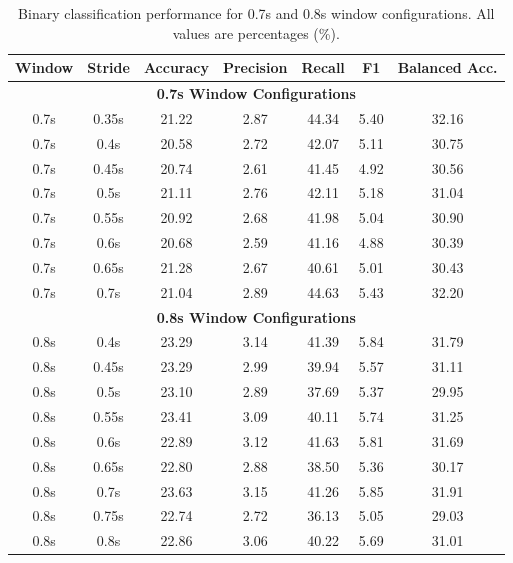 \documentclass[11pt]{article}
\begin{document}
\begin{table}[H]
    \caption{Binary classification performance for 0.7s and 0.8s window configurations. All values are percentages (\%).}
    \centering
    \label{tab:binary-performance-0.7-0.8}
    \scriptsize
    \setlength{\tabcolsep}{3pt}
    \begin{tabular}{|c|c|c|c|c|c|c|}
        \hline
        \textbf{Window} & \textbf{Stride} & \textbf{Accuracy} & \textbf{Precision} & \textbf{Recall} & \textbf{F1} & \textbf{Balanced Acc.} \\
        \hline
        \multicolumn{7}{|c|}{\textbf{0.7s Window Configurations}} \\
        \hline
        0.7s & 0.35s & 21.22 & 2.87 & 44.34 & 5.40 & 32.16 \\
        \hline
        0.7s & 0.4s & 20.58 & 2.72 & 42.07 & 5.11 & 30.75 \\
        \hline
        0.7s & 0.45s & 20.74 & 2.61 & 41.45 & 4.92 & 30.56 \\
        \hline
        0.7s & 0.5s & 21.11 & 2.76 & 42.11 & 5.18 & 31.04 \\
        \hline
        0.7s & 0.55s & 20.92 & 2.68 & 41.98 & 5.04 & 30.90 \\
        \hline
        0.7s & 0.6s & 20.68 & 2.59 & 41.16 & 4.88 & 30.39 \\
        \hline
        0.7s & 0.65s & 21.28 & 2.67 & 40.61 & 5.01 & 30.43 \\
        \hline
        0.7s & 0.7s & 21.04 & 2.89 & 44.63 & 5.43 & 32.20 \\
        \hline
        \multicolumn{7}{|c|}{\textbf{0.8s Window Configurations}} \\
        \hline
        0.8s & 0.4s & 23.29 & 3.14 & 41.39 & 5.84 & 31.79 \\
        \hline
        0.8s & 0.45s & 23.29 & 2.99 & 39.94 & 5.57 & 31.11 \\
        \hline
        0.8s & 0.5s & 23.10 & 2.89 & 37.69 & 5.37 & 29.95 \\
        \hline
        0.8s & 0.55s & 23.41 & 3.09 & 40.11 & 5.74 & 31.25 \\
        \hline
        0.8s & 0.6s & 22.89 & 3.12 & 41.63 & 5.81 & 31.69 \\
        \hline
        0.8s & 0.65s & 22.80 & 2.88 & 38.50 & 5.36 & 30.17 \\
        \hline
        0.8s & 0.7s & 23.63 & 3.15 & 41.26 & 5.85 & 31.91 \\
        \hline
        0.8s & 0.75s & 22.74 & 2.72 & 36.13 & 5.05 & 29.03 \\
        \hline
        0.8s & 0.8s & 22.86 & 3.06 & 40.22 & 5.69 & 31.01 \\
        \hline
    \end{tabular}
\end{table}
\end{document}
